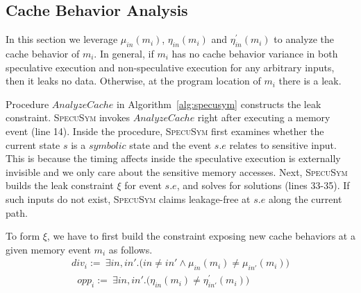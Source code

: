 \documentclass[sigconf, review]{acmart}
\newcommand\ignore[1]{}
\newcommand{\SpecuSym}{\textsc{SpecuSym} }
\begin{document}
\subsection{Cache Behavior Analysis}
\label{sec:analysis}

In this section we leverage $\mathit{\mu_{in}(m_i)}$, $\mathit{\eta_{in}(m_i)}$ 
and $\mathit{\eta^\prime_{in}(m_i)}$ to analyze the cache behavior of $\mathit{m_i}$. 
In general, if $\mathit{m_i}$ has no cache behavior variance in both speculative 
execution and non-speculative execution for any arbitrary inputs, then it leaks 
no data. Otherwise, at the program location of $\mathit{m_i}$ there is a leak. 



Procedure $\mathit{AnalyzeCache}$ in Algorithm~\ref{alg:specusym} constructs the 
leak constraint. \SpecuSym invokes $\mathit{AnalyzeCache}$ right after executing
a memory event (line 14). Inside the procedure, \SpecuSym first examines whether 
the current state $s$ is a $\mathit{symbolic}$ state and the event $s.e$ relates 
to sensitive input. This is because the timing affects inside the speculative 
execution is externally invisible and we only care about the sensitive memory 
accesses. Next, \SpecuSym builds the leak constraint $\xi$ for event $s.e$, and 
solves for solutions (lines 33-35). If such inputs do not exist, \SpecuSym claims 
leakage-free at $s.e$ along the current path.

To form $\xi$, we have to first build the constraint exposing new cache behaviors
at a given memory event $\mathit{m_i}$ as follows.
%
\begin{multline}
  \label{eqn:new_behav}
  ~~~~~~~
  \mathit{div_i}:=~
  \exists\mathit{in,in'}.
  \big(
  \mathit{in\neq in'\wedge\mu_{in}(m_i) \neq \mu_{in'}(m_i)}
  \big)
  ~~~~~~~
\end{multline}
%
\begin{multline}
  \label{eqn:new_behav}
  ~~~~~~~
  \mathit{opp_i}:=~
  \exists\mathit{in,in'}.
  \big(
  \mathit{\eta_{in}(m_i)\neq\eta_{in'}^\prime(m_i)}
  \big)
  ~~~~~~~~~~~~~~~~~~~~~~~
\end{multline}
%



\ignore{
%
\begin{multline}
  \label{eqn:leak}
  ~~
  \xi:=
  \Big(
  \mathit{div_i}
  \wedge
  \big(
  \sum_{\scriptscriptstyle \mathit{k=0}}^{\scriptscriptstyle\mathit{n}} 
  \mathit{\eta_{in''}(m_k)=}0
  \neq
  \sum_{\scriptscriptstyle \mathit{k=0}}^{\scriptscriptstyle\mathit{n}} 
  \mathit{\eta_{in''}(m_k)=}1
  \big)
  \Big)
  \vee 
  \mathit{opp_i}
  ~~
\end{multline}
%
}
\end{document}
